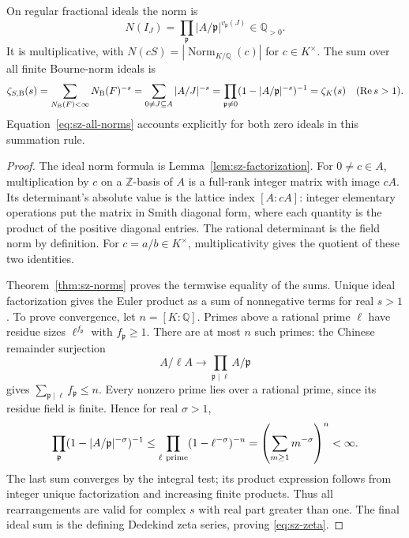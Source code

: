 \begin{proposition}\label{prop:sz-zeta}
On regular fractional ideals the norm is
\[
 N(I_J)=\prod_{\mathfrak p}|A/\mathfrak p|^{v_{\mathfrak p}(J)}
 \in\mathbb Q_{>0}.
\]
It is multiplicative, with
\(N(cS)=|\operatorname{Norm}_{K/\mathbb Q}(c)|\) for \(c\in K^\times\).
The sum over all finite Bourne-norm ideals is
\begin{equation}\label{eq:sz-zeta}
 \zeta_{S,{\rm B}}(s)
 =\sum_{N_{\rm B}(F)<\infty}N_{\rm B}(F)^{-s}
 =\sum_{0\ne J\subseteq A}|A/J|^{-s}
 =\prod_{\mathfrak p\ne0}(1-|A/\mathfrak p|^{-s})^{-1}
 =\zeta_K(s)\quad(\operatorname{Re}s>1).
\end{equation}
Equation~\eqref{eq:sz-all-norms} accounts explicitly for both
zero ideals in this summation rule.
\end{proposition}
\begin{proof}
The ideal norm formula is Lemma~\ref{lem:sz-factorization}.
For \(0\ne c\in A\), multiplication by \(c\) on a \(\mathbb Z\)-basis
of \(A\) is a full-rank integer matrix with image \(cA\).
Its determinant's absolute value is the lattice index \([A:cA]\):
integer elementary operations put the matrix in Smith diagonal form,
where each quantity is the product of the positive diagonal entries.
The rational determinant is the field norm by definition.
For \(c=a/b\in K^\times\), multiplicativity gives the quotient
of these two identities.

Theorem~\ref{thm:sz-norms} proves the termwise equality of the sums.
Unique ideal factorization gives the Euler product as a sum of
nonnegative terms for real \(s>1\). To prove convergence, let
\(n=[K:\mathbb Q]\). Primes above a rational prime \(\ell\) have
residue sizes \(\ell^{f_{\mathfrak p}}\) with \(f_{\mathfrak p}\ge1\).
There are at most \(n\) such primes: the Chinese remainder surjection
\[
 A/\ell A\longrightarrow\prod_{\mathfrak p\mid\ell}A/\mathfrak p
\]
gives \(\sum_{\mathfrak p\mid\ell}f_{\mathfrak p}\le n\).
Every nonzero prime lies over a rational prime, since its residue
field is finite. Hence for real \(\sigma>1\),
\[
 \prod_{\mathfrak p}(1-|A/\mathfrak p|^{-\sigma})^{-1}
 \le\prod_{\ell\ {\rm prime}}(1-\ell^{-\sigma})^{-n}
 =\left(\sum_{m\ge1}m^{-\sigma}\right)^n<\infty.
\]
The last sum converges by the integral test; its product expression
follows from integer unique factorization and increasing finite
products. Thus all rearrangements are valid for complex \(s\)
with real part greater than one. The final ideal sum is the defining
Dedekind zeta series, proving \eqref{eq:sz-zeta}.
\end{proof}

